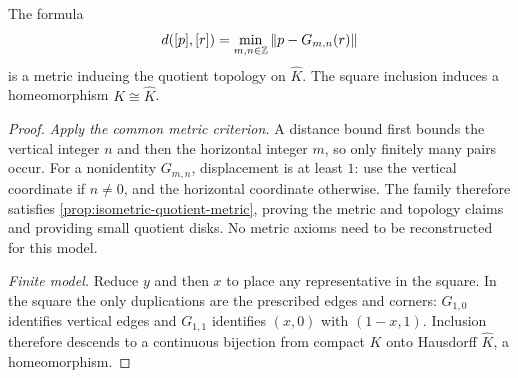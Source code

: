 \begin{proposition}
The formula
\[
d([p],[r])=\min_{m,n\in\mathbb{Z}}\|p-G_{m,n}(r)\|
\]
is a metric inducing the quotient topology on $\widehat K$.
The square inclusion induces a homeomorphism $K\cong\widehat K$.
\end{proposition}
\begin{proof}
\emph{Apply the common metric criterion.} A distance bound first bounds
the vertical integer $n$ and then the horizontal integer $m$, so only
finitely many pairs occur. For a nonidentity $G_{m,n}$, displacement is
at least $1$: use the vertical coordinate if $n\ne0$, and the horizontal
coordinate otherwise. The family therefore satisfies
\cref{prop:isometric-quotient-metric}, proving the metric and topology
claims and providing small quotient disks. No metric axioms need to be
reconstructed for this model.

\emph{Finite model.} Reduce $y$ and then $x$ to place any representative in
the square. In the square the only duplications are the prescribed edges
and corners: $G_{1,0}$ identifies vertical edges and $G_{1,1}$ identifies
$(x,0)$ with $(1-x,1)$. Inclusion therefore descends to a continuous
bijection from compact $K$ onto Hausdorff $\widehat K$, a homeomorphism.
\end{proof}

